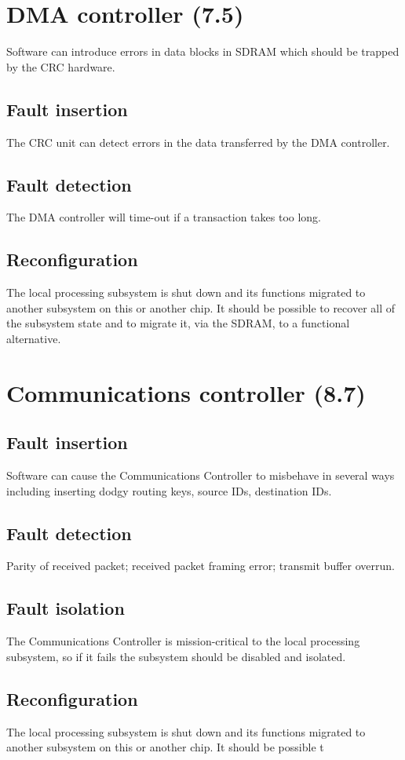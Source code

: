 \documentclass[oneside, a4paper, 11pt]{memoir}
\begin{document}
\section{DMA controller (7.5)}
Software can introduce errors in data blocks in SDRAM which should be trapped by the CRC
hardware.
\subsection*{Fault insertion}
The CRC unit can detect errors in the data transferred by the DMA controller.
\subsection*{Fault detection}
The DMA controller will time-out if a transaction takes too long.
\subsection*{Reconfiguration}
The local processing subsystem is shut down and its functions migrated to another subsystem on
this or another chip. It should be possible to recover all of the subsystem state and to migrate it, via
the SDRAM, to a functional alternative.

\section{Communications controller (8.7)}
\subsection*{Fault insertion}
Software can cause the Communications Controller to misbehave in several ways including
inserting dodgy routing keys, source IDs, destination IDs.
\subsection*{Fault detection}
Parity of received packet; received packet framing error; transmit buffer overrun.
\subsection*{Fault isolation}
The Communications Controller is mission-critical to the local processing subsystem, so if it fails
the subsystem should be disabled and isolated.
\subsection*{Reconfiguration}
The local processing subsystem is shut down and its functions migrated to another subsystem on
this or another chip. It should be possible t
\end{document}
